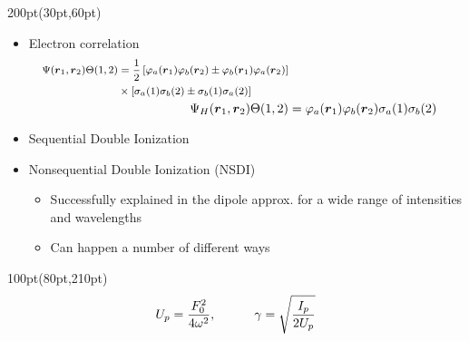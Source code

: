 \begin{frame}
\small
\begin{textblock*}{200pt}(30pt,60pt)
\begin{itemize}
\item Electron correlation
\begin{align}
\footnotesize
\begin{split}
\Psi(\boldsymbol{r}_1,\boldsymbol{r}_2) \Theta(1,2)
 & = \frac{1}{2}\left[ \varphi_a(\boldsymbol{r}_1)\varphi_b(\boldsymbol{r}_2)
 \pm  \varphi_b(\boldsymbol{r}_1)\varphi_a(\boldsymbol{r}_2) \right] \\
 &\times \left[ \sigma_a(1)\sigma_b(2)
 \pm  \sigma_b(1)\sigma_a(2) \right]
\end{split}
 \nonumber \\
\Psi_H(\boldsymbol{r}_1,\boldsymbol{r}_2) \Theta(1,2)
 & = \varphi_a(\boldsymbol{r}_1)\varphi_b(\boldsymbol{r}_2)
 \sigma_a(1)\sigma_b(2)
 \nonumber
\end{align}
\item Sequential Double Ionization
\item Nonsequential Double Ionization (NSDI)
\begin{itemize}
 \item[$\bullet$] Successfully explained in the dipole approx.
  for a wide range of intensities and wavelengths
 \item[$\bullet$] Can happen a number of different ways
\end{itemize}
\end{itemize}
\end{textblock*}



\begin{textblock*}{100pt}(80pt,210pt)
\begin{align}
\footnotesize
U_p = \frac{F_0^2}{4\omega^2}, \hspace{30pt} 
\gamma = \sqrt{\frac{I_p}{2U_p}}\nonumber
\end{align}
\end{textblock*}


\end{frame}

